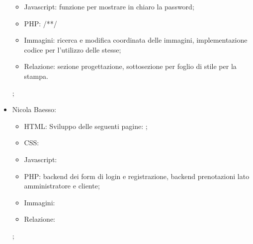 \documentclass[]{article}
\begin{document}
\begin{itemize}
\begin{itemize}
		\item Javascript: funzione per mostrare in chiaro la password;
		\item PHP: /**/
		\item Immagini: ricerca e modifica coordinata delle immagini, implementazione codice per l'utilizzo delle stesse;
		\item Relazione: sezione progettazione, sottosezione per foglio di stile per la stampa. 
	\end{itemize} ;
	\item Nicola Baesso:
	\begin{itemize}
		\item HTML: Sviluppo delle seguenti pagine: ;
		\item CSS:
		\item Javascript:
		\item PHP: backend dei form di login e registrazione, backend prenotazioni lato amministratore e cliente;
		\item Immagini:
		\item Relazione:
	\end{itemize} ;
\end{itemize}
\end{document}
